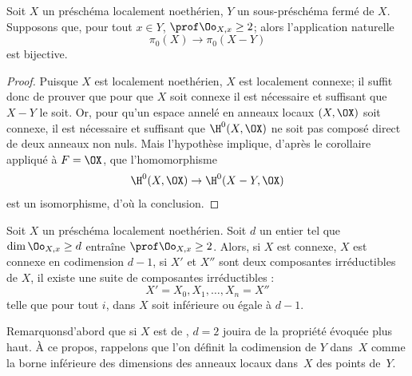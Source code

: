 \begin{theoreme} \label{III.3.6}
Soit $X$ un pr\'esch\'ema localement noeth\'erien, $Y$ un sous-pr\'esch\'ema ferm\'e de $X$. Supposons que, pour tout $x\in Y$, $\prof \Oo_{X, x} \geq 2$; alors l'application naturelle
\[
\pi_0(X) \to \pi_0(X-Y)
\]
est bijective.
\end{theoreme}

\begin{proof}
Puisque $X$ est localement noeth\'erien, $X$ est localement connexe; il suffit donc de prouver que pour que $X$ soit connexe il est n\'ecessaire et suffisant que $X-Y$ le soit. Or, pour qu'un espace annel\'e en anneaux  locaux $(X, \OX)$ soit connexe, il est n\'ecessaire et suffisant que $\H^0(X, \OX)$ ne soit pas compos\'e direct de deux anneaux non nuls. Mais l'hypoth\`ese implique, d'apr\`es le corollaire  appliqu\'e \`a $F=\OX$, que l'homomorphisme
\[
\H^0(X, \OX) \to \H^0(X-Y, \OX)
\]
est un isomorphisme, d'o\`u la conclusion.
\skipqed
\end{proof}

\begin{corollaire} \label{III.3.7}
Soit $X$ un pr\'esch\'ema localement noeth\'erien. Soit $d$ un entier tel que $\dim \Oo_{X, x} \geq d$ entra\^ine $\prof \Oo_{X, x} \geq 2$. Alors, si $X$ est connexe, $X$ est connexe en codimension $d-1$, \ie si $X'$ et $X''$ sont deux composantes irr\'eductibles de $X$, il existe une suite de composantes irr\'eductibles :
\[
X'=X_0, X_1, \ldots, X_n=X''
\]
telle que pour tout $i$,  dans $X$ soit inf\'erieure ou \'egale \`a $d-1$.
\end{corollaire}

Remarquons\pageoriginale d'abord que si $X$ est de , $d=2$ jouira de la propri\'et\'e \'evoqu\'ee plus haut. \`A ce propos, rappelons que l'on d\'efinit la codimension de $Y$ dans~$X$ comme la borne inf\'erieure des dimensions des anneaux locaux dans~$X$ des points de~$Y$.

